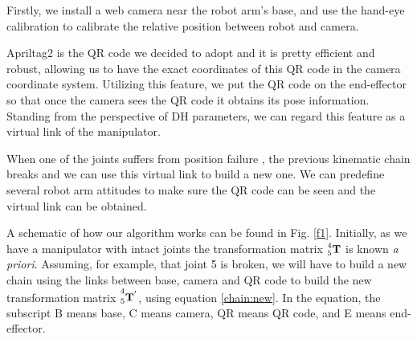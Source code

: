 \documentclass{ieeeaccess}
\begin{document}
Firstly, we install a web camera near the robot arm's base, and use the hand-eye calibration to calibrate the relative position between robot and camera.

Apriltag2 \cite{wang2016iros} is the QR code we decided to adopt and it is pretty efficient and robust, allowing us to have the exact coordinates of this QR code in the camera coordinate system. Utilizing this feature, we put the QR code on the end-effector so that once the camera sees the QR code it obtains its pose information. Standing from the perspective of DH parameters, we can regard this feature as a virtual link of the manipulator. 

When one of the joints suffers from position failure \cite{maciejewski1990fault,paredis1994kinematic,roberts1996local}, the previous kinematic chain breaks and we can use this virtual link to build a new one. We can predefine several robot arm attitudes to make sure the QR code can be seen and the virtual link can be obtained.


A schematic of how our algorithm works can be found in Fig. \ref{f1}. Initially, as we have a manipulator with intact joints the transformation matrix $\prescript{4}{5}{\mathbf{T}}$ is known \emph{a priori}. Assuming, for example, that joint 5 is broken, we will have to build a new chain using the links between base, camera and QR code to build the new transformation matrix $\prescript{4}{5}{\mathbf{T^{'}}}$, using equation \ref{chain:new}. In the equation, the subscript B means base, C means camera, QR means QR code, and E means end-effector.

\end{document}
